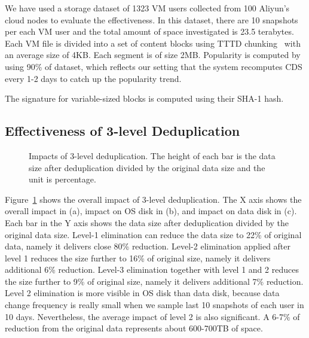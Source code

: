 We have used a storage dataset of  1323 VM users collected from 100 Aliyun's cloud nodes  to evaluate the effectiveness.
In this dataset, there are 10 snapshots per each VM user and the total amount of space investigated 
is 23.5 terabytes.
Each VM file is  divided into a set of content blocks using
TTTD chunking~\cite{??} with an average size of 4KB. Each segment is of size 2MB.  
Popularity is computed by using 90\% of dataset, which reflects our setting that the system recomputes
CDS every 1-2 days to catch up the popularity trend.

The signature for variable-sized blocks is computed using  their SHA-1 hash. 



\subsection{Effectiveness of 3-level Deduplication}

\begin{figure}
  \centering
  \caption{Impacts of 3-level deduplication. The height of each bar is the data size after 
deduplication divided by the original data size and the unit is percentage. }

  \label{fig:overall}
\end{figure}

Figure~\ref{fig:overall} shows the overall impact of 3-level deduplication.
The X axis shows the overall impact in (a),  impact on OS disk in (b), and impact on data disk in (c).
Each bar in the Y axis shows the data size after deduplication divided by the original data size.
Level-1 elimination can reduce the data size to 22\% of original data, namely it delivers close 80\% reduction.
Level-2 elimination applied after level 1
reduces the size further to 16\% of original size, namely it delivers additional 6\% reduction.
Level-3 elimination together with level 1 and 2
reduces the size further to 9\% of original size, namely it delivers additional 7\% reduction.
Level 2 elimination is more visible in OS disk than data disk, because data change frequency is really small
when we sample last 10 snapshots of each user in 10 days. Nevertheless, the average impact of level 2 is also significant.
A 6-7\% of reduction from the original data represents about 600-700TB of space.



